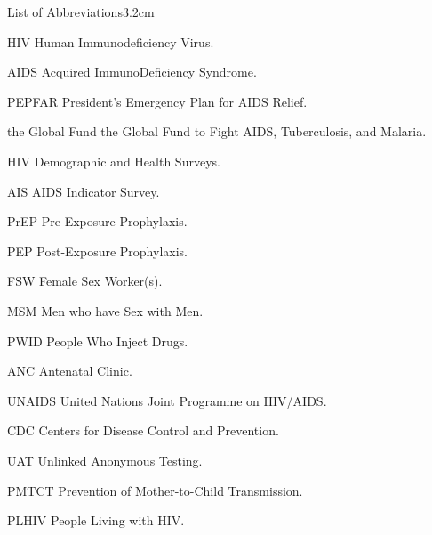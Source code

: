 

\begin{mclistof}{List of Abbreviations}{3.2cm}

\item[HIV] Human Immunodeficiency Virus.
\item[AIDS] Acquired ImmunoDeficiency Syndrome.
\item[PEPFAR] President’s Emergency Plan for AIDS Relief.
\item[the Global Fund] the Global Fund to Fight AIDS, Tuberculosis, and Malaria.
\item[HIV] Demographic and Health Surveys.
\item[AIS] AIDS Indicator Survey.
\item[PrEP] Pre-Exposure Prophylaxis.
\item[PEP] Post-Exposure Prophylaxis.
\item[FSW] Female Sex Worker(s).
\item[MSM] Men who have Sex with Men.
\item[PWID] People Who Inject Drugs.
\item[ANC] Antenatal Clinic.
\item[UNAIDS] United Nations Joint Programme on HIV/AIDS.
\item[CDC] Centers for Disease Control and Prevention.
\item[UAT] Unlinked Anonymous Testing.
\item[PMTCT] Prevention of Mother-to-Child Transmission.
\item[PLHIV] People Living with HIV.


\end{mclistof}
